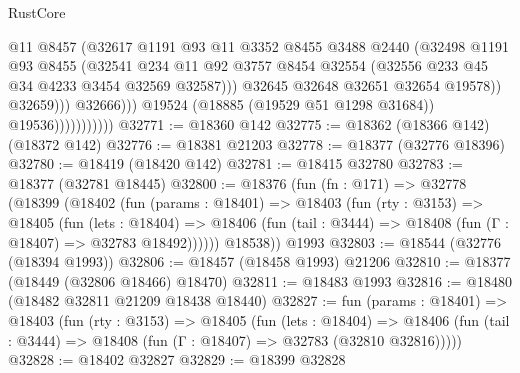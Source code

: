 \begin{lexlean}{RustCore}
\begin{coremodule}
                                        @11
                                        @8457
                                        (@32617
                                          @1191
                                          @93
                                          @11
                                          @3352
                                          @8455
                                          @3488
                                          @2440
                                          (@32498
                                            @1191
                                            @93
                                            @8455
                                            (@32541
                                              @234
                                              @11
                                              @92
                                              @3757
                                              @8454
                                              @32554
                                              (@32556 @233 @45 @34 @4233 @3454 @32569 @32587)))
                                          @32645
                                          @32648
                                          @32651
                                          @32654
                                          @19578))
                                      @32659)))
                                @32666)))
                          @19524
                          (@18885 (@19529 @51 @1298 @31684))
                          @19536)))))))))))
@32771 := @18360 @142
@32775 := @18362 (@18366 @142) (@18372 @142)
@32776 := @18381 @21203
@32778 := @18377 (@32776 @18396)
@32780 := @18419 (@18420 @142)
@32781 := @18415 @32780
@32783 := @18377 (@32781 @18445)
@32800 := @18376
    (fun (fn : @171) =>
    @32778
      (@18399
        (@18402
          (fun (params : @18401) =>
          @18403
            (fun (rty : @3153) =>
            @18405
              (fun (lets : @18404) =>
              @18406 (fun (tail : @3444) => @18408 (fun (Γ : @18407) => @32783 @18492))))))
        @18538))
    @1993
@32803 := @18544 (@32776 (@18394 @1993))
@32806 := @18457 (@18458 @1993) @21206
@32810 := @18377 (@18449 (@32806 @18466) @18470)
@32811 := @18483 @1993
@32816 := @18480 (@18482 @32811 @21209 @18438 @18440)
@32827 := fun (params : @18401) =>
  @18403
    (fun (rty : @3153) =>
    @18405
      (fun (lets : @18404) =>
      @18406 (fun (tail : @3444) => @18408 (fun (Γ : @18407) => @32783 (@32810 @32816)))))
@32828 := @18402 @32827
@32829 := @18399 @32828

\end{coremodule}
\end{lexlean}
